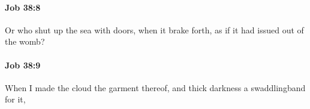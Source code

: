 		\paragraph{Job 38:8} %
			\label{JOB-38-8}

			Or who shut up the sea with doors, when it brake forth, as if it had issued out of the womb?


		\paragraph{Job 38:9} %
			\label{JOB-38-9}

			When I made the cloud the garment thereof, and thick darkness a swaddlingband for it,


